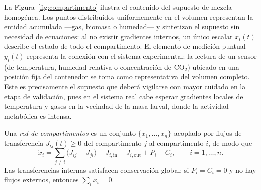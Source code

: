 La Figura~\ref{fig:compartimento} ilustra el contenido del supuesto de mezcla
homogénea. Los puntos distribuidos uniformemente en el volumen representan la
entidad acumulada ---gas, biomasa o humedad--- y sintetizan el supuesto sin
necesidad de ecuaciones: al no existir gradientes internos, un único escalar
$x_i(t)$ describe el estado de todo el compartimento. El elemento de medición
puntual $y_i(t)$ representa la conexión con el sistema experimental: la
lectura de un sensor (de temperatura, humedad relativa o concentración de
CO$_2$) ubicado en una posición fija del contenedor se toma como
representativa del volumen completo. Este es precisamente el supuesto que
deberá vigilarse con mayor cuidado en la etapa de validación, pues en el
sistema real cabe esperar gradientes locales de temperatura y gases en la
vecindad de la masa larval, donde la actividad metabólica es intensa.

\begin{definition}\label{def14}
Una \emph{red de compartimentos} es un conjunto $\{x_1, \dots, x_n\}$ acoplado
por flujos de transferencia $J_{ij}(t) \geq 0$ del compartimento $j$ al
compartimento $i$, de modo que
\begin{equation}
\dot{x}_i = \sum_{j \neq i} \bigl( J_{ij} - J_{ji} \bigr)
+ J_{i,\mathrm{in}} - J_{i,\mathrm{out}} + P_i - C_i,
\qquad i = 1, \dots, n.
\label{eq:red}
\end{equation}
Las transferencias internas satisfacen conservación global: si $P_i = C_i = 0$
y no hay flujos externos, entonces $\sum_i \dot{x}_i = 0$.
\end{definition}

